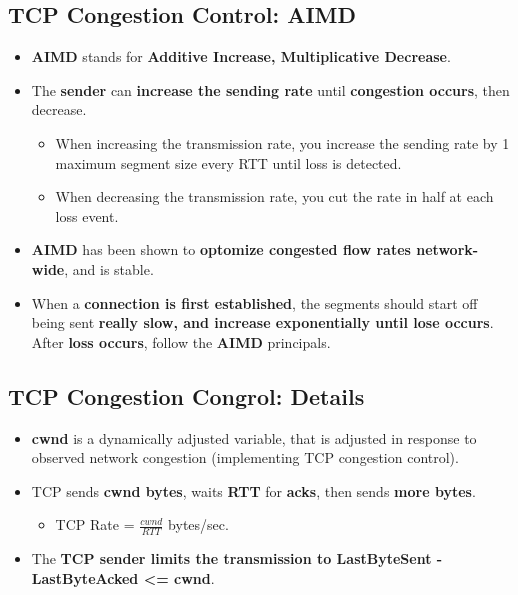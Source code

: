 \documentclass{article}
\begin{document}
    \subsection*{TCP Congestion Control: AIMD}
    \begin{itemize}
        \item \textbf{AIMD} stands for \textbf{Additive Increase, Multiplicative Decrease}.
        \item The \textbf{sender} can \textbf{increase the sending rate} until \textbf{congestion occurs}, then decrease.
        \begin{itemize}
            \item When increasing the transmission rate, you increase the sending rate by 1 maximum segment size every RTT until loss is detected.
            \item When decreasing the transmission rate, you cut the rate in half at each loss event.
        \end{itemize}
        \item \textbf{AIMD} has been shown to \textbf{optomize congested flow rates network-wide}, and is stable.
        \item When a \textbf{connection is first established}, the segments should start off being sent \textbf{really slow, and increase exponentially until lose occurs}. After \textbf{loss occurs}, follow the \textbf{AIMD} principals.
    \end{itemize}

    \subsection*{TCP Congestion Congrol: Details}
    \begin{itemize}
        \item \textbf{cwnd} is a dynamically adjusted variable, that is adjusted in response to observed network congestion (implementing TCP congestion control).
        \item TCP sends \textbf{cwnd bytes}, waits \textbf{RTT} for \textbf{acks}, then sends \textbf{more bytes}.
        \begin{itemize}
            \item TCP Rate = $\frac{cwnd}{RTT}$ bytes/sec.
        \end{itemize}
        \item The \textbf{TCP sender limits the transmission to LastByteSent - LastByteAcked <= cwnd}. 
    \end{itemize}
\end{document}
